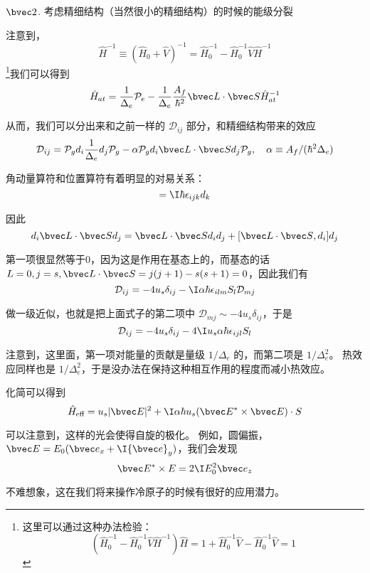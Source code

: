 {$\bvec 2$. }考虑精细结构（当然很小的精细结构）的时候的能级分裂

注意到，
\begin{equation}
{\hat H}^{-1} \equiv ({\hat H}_0+\hat{V})^{-1} = {\hat H}_0^{-1} - {\hat H}_0^{-1}\hat{V} {\hat H}^{-1}
\end{equation}
\footnote{这里可以通过这种办法检验：
\begin{equation}
({\hat H}_0^{-1} - {\hat H}_0^{-1}\hat{V} {\hat H}^{-1}) \hat{H}  = 1 + {\hat H}_0^{-1} \hat{V} - {\hat H}_0^{-1}\hat{V} = 1
\end{equation}
}我们可以得到
\begin{equation}
\hat{H}_{at} = \frac{1}{\Delta_e}\mathcal{P}_e-\frac{1}{\Delta_e}\frac{A_f}{\hbar^2}{\bvec L\cdot \bvec S}\hat{H}_{at}^{-1} 
\end{equation}

从而，我们可以分出来和之前一样的 $\mathcal{D}_{ij}$ 部分，和精细结构带来的效应
\begin{equation}
\mathcal{D}_{ij} = \mathcal{P}_g d_i \frac{1}{\Delta_e} d_j \mathcal{P}_g - \alpha \mathcal{P}_g d_i {\bvec L\cdot \bvec S}d_j\mathcal{P}_g,\quad \alpha \equiv A_f/(\hbar^2\Delta_e)
\end{equation}

角动量算符和位置算符有着明显的对易关系：
\begin{equation}
[L_i,d_j] = \I\hbar\epsilon_{ijk}d_k
\end{equation}

因此
\begin{equation}
d_i {\bvec L\cdot \bvec S}d_j = {\bvec L\cdot \bvec S}d_id_j + [{\bvec L\cdot \bvec S}, d_i]d_j
\end{equation}

第一项很显然等于0，因为这是作用在基态上的，而基态的话 $L=0, j = s, {\bvec L\cdot \bvec S} = j(j+1) - s(s+1) = 0$，因此我们有
\begin{equation}
\mathcal{D}_{ij} = -4u_s\delta_{ij} - \I\alpha\hbar\epsilon_{ilm} S_l \mathcal{D}_{mj}
\end{equation}

做一级近似，也就是把上面式子的第二项中 $\mathcal{D}_{mj} \sim -4u_s\delta_{ij}$，于是
\begin{equation}
\mathcal{D}_{ij} = -4u_s\delta_{ij} - 4\I u_s\alpha\hbar\epsilon_{ijl} S_l
\end{equation}

注意到，这里面，第一项对能量的贡献是量级 $1/\Delta_e$ 的，而第二项是 $1/\Delta_e^2$。 热效应同样也是 $1/\Delta_e^2$，于是没办法在保持这种相互作用的程度而减小热效应。

化简可以得到
\begin{equation}
\hat{H}_{\text{eff}} = u_s|{\bvec E}|^2 + \I \alpha\hbar u_s ({\bvec E^*\times \bvec E )\cdot S}
\end{equation}

可以注意到，这样的光会使得自旋的极化。 例如，圆偏振，${\bvec E} = E_0 ({\bvec e}_x + \I{\bvec e}_y)$，我们会发现
\begin{equation}
{\bvec E^*\times E} = 2\I E_0^2{\bvec e}_z
\end{equation}

不难想象，这在我们将来操作冷原子的时候有很好的应用潜力。
